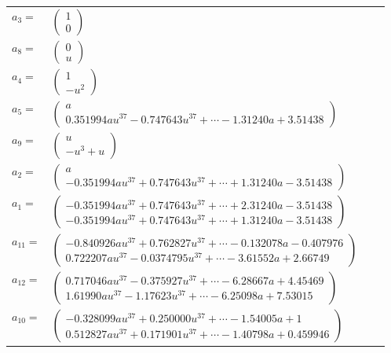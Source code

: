\documentclass[1p]{elsarticle_modified}
\theoremstyle{definition}
\begin{document}
\begin{tabular}{m{7pt} m{180pt} m{7pt} m{180pt} }
\flushright $a_{3}=$&$\begin{pmatrix}1\\0\end{pmatrix}$ \\
\flushright $a_{8}=$&$\begin{pmatrix}0\\u\end{pmatrix}$ \\
\flushright $a_{4}=$&$\begin{pmatrix}1\\- u^2\end{pmatrix}$ \\
\flushright $a_{5}=$&$\begin{pmatrix}a\\0.351994 a u^{37}-0.747643 u^{37}+\cdots-1.31240 a+3.51438\end{pmatrix}$ \\
\flushright $a_{9}=$&$\begin{pmatrix}u\\- u^3+u\end{pmatrix}$ \\
\flushright $a_{2}=$&$\begin{pmatrix}a\\-0.351994 a u^{37}+0.747643 u^{37}+\cdots+1.31240 a-3.51438\end{pmatrix}$ \\
\flushright $a_{1}=$&$\begin{pmatrix}-0.351994 a u^{37}+0.747643 u^{37}+\cdots+2.31240 a-3.51438\\-0.351994 a u^{37}+0.747643 u^{37}+\cdots+1.31240 a-3.51438\end{pmatrix}$ \\
\flushright $a_{11}=$&$\begin{pmatrix}-0.840926 a u^{37}+0.762827 u^{37}+\cdots-0.132078 a-0.407976\\0.722207 a u^{37}-0.0374795 u^{37}+\cdots-3.61552 a+2.66749\end{pmatrix}$ \\
\flushright $a_{12}=$&$\begin{pmatrix}0.717046 a u^{37}-0.375927 u^{37}+\cdots-6.28667 a+4.45469\\1.61990 a u^{37}-1.17623 u^{37}+\cdots-6.25098 a+7.53015\end{pmatrix}$ \\
\flushright $a_{10}=$&$\begin{pmatrix}-0.328099 a u^{37}+0.250000 u^{37}+\cdots-1.54005 a+1\\0.512827 a u^{37}+0.171901 u^{37}+\cdots-1.40798 a+0.459946\end{pmatrix}$ \\

\end{tabular}
\end{document}
